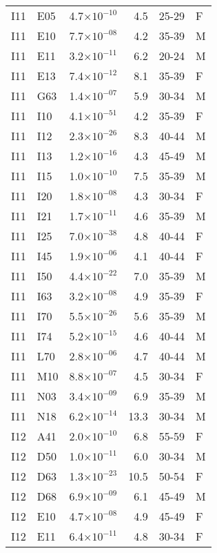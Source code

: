 \begin{longtable}{lllrll}
   I11 & E05 & 4.7$\times10^{-10}$ & 4.5 & 25-29 & F \\ 
   I11 & E10 & 7.7$\times10^{-08}$ & 4.2 & 35-39 & M \\ 
   I11 & E11 & 3.2$\times10^{-11}$ & 6.2 & 20-24 & M \\ 
   I11 & E13 & 7.4$\times10^{-12}$ & 8.1 & 35-39 & F \\ 
   I11 & G63 & 1.4$\times10^{-07}$ & 5.9 & 30-34 & M \\ 
   I11 & I10 & 4.1$\times10^{-51}$ & 4.2 & 35-39 & F \\ 
   I11 & I12 & 2.3$\times10^{-26}$ & 8.3 & 40-44 & M \\ 
   I11 & I13 & 1.2$\times10^{-16}$ & 4.3 & 45-49 & M \\ 
   I11 & I15 & 1.0$\times10^{-10}$ & 7.5 & 35-39 & M \\ 
   I11 & I20 & 1.8$\times10^{-08}$ & 4.3 & 30-34 & F \\ 
   I11 & I21 & 1.7$\times10^{-11}$ & 4.6 & 35-39 & M \\ 
   I11 & I25 & 7.0$\times10^{-38}$ & 4.8 & 40-44 & F \\ 
   I11 & I45 & 1.9$\times10^{-06}$ & 4.1 & 40-44 & F \\ 
   I11 & I50 & 4.4$\times10^{-22}$ & 7.0 & 35-39 & M \\ 
   I11 & I63 & 3.2$\times10^{-08}$ & 4.9 & 35-39 & F \\ 
   I11 & I70 & 5.5$\times10^{-26}$ & 5.6 & 35-39 & M \\ 
   I11 & I74 & 5.2$\times10^{-15}$ & 4.6 & 40-44 & M \\ 
   I11 & L70 & 2.8$\times10^{-06}$ & 4.7 & 40-44 & M \\ 
   I11 & M10 & 8.8$\times10^{-07}$ & 4.5 & 30-34 & F \\ 
   I11 & N03 & 3.4$\times10^{-09}$ & 6.9 & 35-39 & M \\ 
   I11 & N18 & 6.2$\times10^{-14}$ & 13.3 & 30-34 & M \\ 
   I12 & A41 & 2.0$\times10^{-10}$ & 6.8 & 55-59 & F \\ 
   I12 & D50 & 1.0$\times10^{-11}$ & 6.0 & 30-34 & M \\ 
   I12 & D63 & 1.3$\times10^{-23}$ & 10.5 & 50-54 & F \\ 
   I12 & D68 & 6.9$\times10^{-09}$ & 6.1 & 45-49 & M \\ 
   I12 & E10 & 4.7$\times10^{-08}$ & 4.9 & 45-49 & F \\ 
   I12 & E11 & 6.4$\times10^{-11}$ & 4.8 & 30-34 & F \\ 

\end{longtable}

